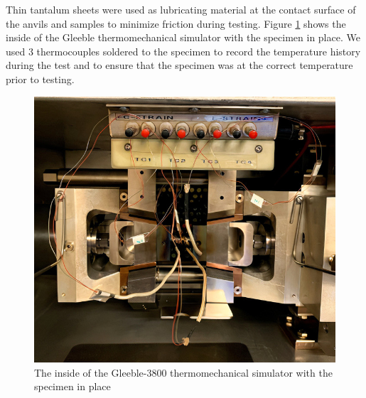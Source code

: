\documentclass[metals,article,submit,pdftex,moreauthors]{Definitions/mdpi}
\begin{document}
Thin tantalum sheets were used as lubricating material at the contact surface of the anvils and samples to minimize friction during testing.
Figure \ref{fig:Inside-Gleeble3800} shows the inside of the Gleeble thermomechanical simulator with the specimen in place. We used 3 thermocouples soldered to the specimen to record the temperature history during the test and to ensure that the specimen was at the correct temperature prior to testing.
\begin{figure}[!ht]
\centering
\includegraphics[width=0.7\columnwidth]{Figures/Gleeble-1}
\caption{The inside of the Gleeble-3800 thermomechanical simulator with the specimen in place}
\label{fig:Inside-Gleeble3800}
\end{figure}
\end{document}
